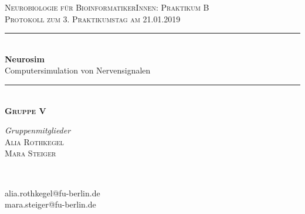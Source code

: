 \documentclass[11pt]{article}
\begin{document}
\begin{titlepage} %
	\newcommand{\HRule}{\rule{\linewidth}{0.5mm}} %
	
	\center %
	\vspace*{0.75cm}

	
	\textsc{\Large Neurobiologie für BioinformatikerInnen: Praktikum B}\\[0.65cm] %
	
	\textsc{\large Protokoll zum 3. Praktikumstag am 21.01.2019}\\[0.65cm] %

	\HRule\\[0.5cm]
	
	{\huge\bfseries Neurosim} \\[0.2cm]{\Large Computersimulation von Nervensignalen}\\[0.3cm] %
	
	\HRule\\[0.75cm]
	\textsc{\Large\bfseries Gruppe V}
	\\[0.8cm]
	
\vfill

	\begin{minipage}{0.45\textwidth}
		\begin{flushleft}
			\large
			\textit{Gruppenmitglieder}\\
			\textsc{Alia Rothkegel}\\
			\textsc{Mara Steiger}
		\end{flushleft}
	\end{minipage}
	~
	\begin{minipage}{0.45\textwidth}
		\begin{flushright}
			\large \vspace{16pt}
			alia.rothkegel@fu-berlin.de\\
			mara.steiger@fu-berlin.de 
		\end{flushright}
	\end{minipage}
	
\vfill


\end{titlepage}
\end{document}
